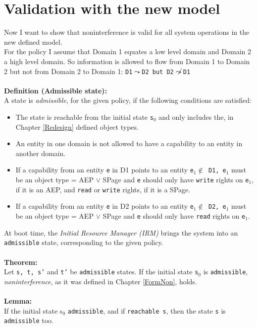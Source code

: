 \documentclass[11pt,a4paper, twoside, open=right]{scrreprt}
\begin{document}
\chapter{Validation with the new model}\label{ValNew}
Now I want to show that noninterference is valid for all system operations in the new defined model. \\ 
For the policy I assume that Domain 1 equates a low level domain and Domain 2 a high level domain. So  information is allowed to flow from Domain 1 to Domain 2 but not from Domain 2 to Domain 1: \texttt{D1$\leadsto$D2 but D2$\not\leadsto$D1} \\ \\
\textbf{Definition (Admissible state):} \\ 
A state is \textit{admissible}, for the given policy, if the following conditions are satisfied:
\begin{itemize}
\item The state is reachable from the initial state \texttt{s$_0$} and only includes the, in Chapter \ref{Redesign} defined object types. 
\item An entity in one domain is not allowed to have a capability to an entity in another domain.
\item If a capability from an entity \texttt{e} in D1 points to an entity \texttt{e$_1 \notin$ D1, e$_1$} must be an object type = AEP $\vee$ SPage and \texttt{e} should only have \texttt{write} rights on \texttt{e$_1$}, if it is an AEP, and \texttt{read} or \texttt{write} rights, if it is a SPage.
\item If a capability from an entity \texttt{e} in D2 points to an entity \texttt{e$_1 \notin$ D2, e$_1$} must be an object type = AEP $\vee$ SPage and \texttt{e} should only have \texttt{read} rights on \texttt{e$_1$}. 
\end{itemize} 
At boot time, the \textit{Initial Resource Manager (IRM)} brings the system into an \texttt{admissible} state, corresponding to the given policy. \\ \\
\textbf{Theorem:}\\ 
Let \texttt{s, t, s'} and \texttt{t'} be \texttt{admissible} states. 
If the initial state \texttt{s$_0$} is \texttt{admissible}, \textit{noninterference}, as it was defined in Chapter \ref{FormNon}, holds. \\ \\
\textbf{Lemma:}\\
If the initial state {s$_0$} \texttt{admissible}, and if \texttt{reachable s}, then the state \texttt{s} is \texttt{admissible} too.  \\ \\
\end{document}
